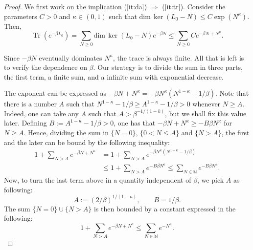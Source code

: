 \documentclass[a4paper,12pt]{article}
\theoremstyle{plain}
\theoremstyle{definition}
\theoremstyle{remark}
\def\dim{\mathrm{dim}\,}
\DeclareMathOperator{\Tr}{Tr}
\begin{document}
\begin{proof}
  We first work on the implication (\ref{it:da}) $\Rightarrow$ (\ref{it:tr}). Consider the parameters $C>0$ and $\kappa\in(0,1)$ such that $\dim \ker (L_0-N)\le C\exp(N^\kappa)$. Then,
  \[ \Tr(e^{-\beta L_0}) = \sum_{N\ge 0} \dim \ker (L_0-N)e^{-\beta N}
  \le \sum_{N\ge 0} C e^{-\beta N + N^\kappa}. \]

  Since $-\beta N$ eventually dominates $N^\kappa$, the trace is always finite. All that is left is to verify the dependence on $\beta$. Our strategy is to divide the sum in three parts, the first term, a finite sum, and a infinite sum with exponential decrease.

  The exponent can be expressed as $-\beta N + N^\kappa = -\beta N^\kappa (N^{1-\kappa}-1/\beta)$.
  Note that there is a number $A$ such that $N^{1-\kappa}-1/\beta \ge A^{1-\kappa}-1/\beta  > 0$ whenever $N\ge A$. Indeed, one can take any $A$ such that $A > \beta^{-1/(1-k)}$, but we shall fix this value later. Defining $B := A^{1-\kappa}-1/\beta > 0$, one has that $-\beta N+N^\kappa \ge -B\beta N^\kappa$ for $N\ge A$. Hence, dividing the sum in $\{N=0\}$, $\{0<N\le A\}$ and $\{N > A\}$, the first and the later can be bound by the following inequality:  
  \begin{align*} 1 + \sum_{N>A} e^{-\beta N + N^\kappa} &=
  1 + \sum_{N> A} e^{-\beta N^\kappa(N^{1-\kappa}-1/\beta)} \\ &
  \le 1 + \sum_{N> A} e^{-B \beta N^\kappa} \le \sum_{N\in \mathbb{N}} e^{-B \beta N^\kappa}. \end{align*}
  Now, to turn the last term above in a quantity independent of $\beta$, we pick $A$ as following: \[ A := (2/\beta)^{1/(1-\kappa)}, \qquad B=1/\beta. \]
  The sum $\{N=0\}\cup\{N> A\}$ is then bounded by a constant expressed in the following:
  \[1+\sum_{N> A} e^{-\beta N + N^\kappa} \le \sum_{N\in \mathbb{N}} e^{-N^\kappa}.\]
  

\end{proof}
\end{document}
